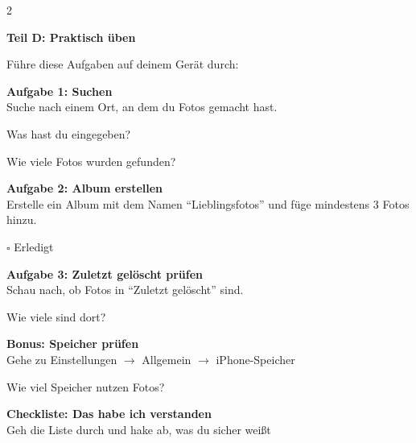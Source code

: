 \documentclass[a4paper,landscape,8pt]{extarticle}
\begin{document}
\begin{multicols}{2}
\columnbreak

\textbf{\large Teil D: Praktisch üben}

Führe diese Aufgaben auf deinem Gerät durch:

\vspace{3mm}

\textbf{Aufgabe 1: Suchen}\\
Suche nach einem Ort, an dem du Fotos gemacht hast.

\vspace{2mm}
Was hast du eingegeben? \dotfill

\vspace{2mm}
Wie viele Fotos wurden gefunden? \dotfill

\vspace{5mm}

\textbf{Aufgabe 2: Album erstellen}\\
Erstelle ein Album mit dem Namen ``Lieblingsfotos'' und füge mindestens 3 Fotos hinzu.

\vspace{2mm}
$\square$ Erledigt

\vspace{5mm}

\textbf{Aufgabe 3: Zuletzt gelöscht prüfen}\\
Schau nach, ob Fotos in ``Zuletzt gelöscht'' sind.

\vspace{2mm}
Wie viele sind dort? \dotfill

\vspace{5mm}

\textbf{Bonus: Speicher prüfen}\\
Gehe zu Einstellungen $\rightarrow$ Allgemein $\rightarrow$ iPhone-Speicher

\vspace{2mm}
Wie viel Speicher nutzen Fotos? \dotfill

\end{multicols}

\newpage


\begin{center}
{\LARGE\bfseries Checkliste: Das habe ich verstanden}\\[3pt]
{\normalsize Geh die Liste durch und hake ab, was du sicher weißt}
\end{center}
\end{document}
